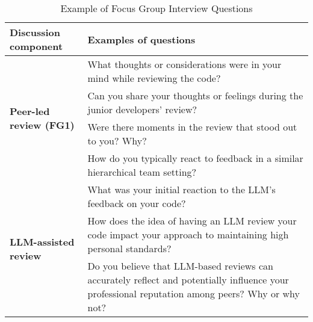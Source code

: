 \begin{table*}[th!]
\footnotesize
    \caption{Example of Focus Group Interview Questions}

    \label{tab:phase2_guide}
    \renewcommand\arraystretch{1.8}
    
    \begin{tabular}{p{2.8cm}p{10.5cm}}
    \toprule
      \textbf{Discussion component} & \textbf{Examples of questions}\\
      \hline
      
      \multirow{4}{2.8cm}{\textbf{Peer-led review (FG1)}} &  What thoughts or considerations were in your mind while reviewing the code?\\

      & Can you share your thoughts or feelings during the junior developers' review?\\

      & Were there moments in the review that stood out to you? Why?\\

      & How do you typically react to feedback in a similar hierarchical team setting?\\ \hline
      
      \multirow{4}{2.8cm}{\textbf{LLM-assisted review}} & What was your initial reaction to the LLM's feedback on your code?\\

      & How does the idea of having an LLM review your code impact your approach to maintaining high personal standards?\\

      & Do you believe that LLM-based reviews can accurately reflect and potentially influence your professional reputation among peers? Why or why not?\\ 
      
     \bottomrule
     
    \end{tabular}
  
\end{table*}

